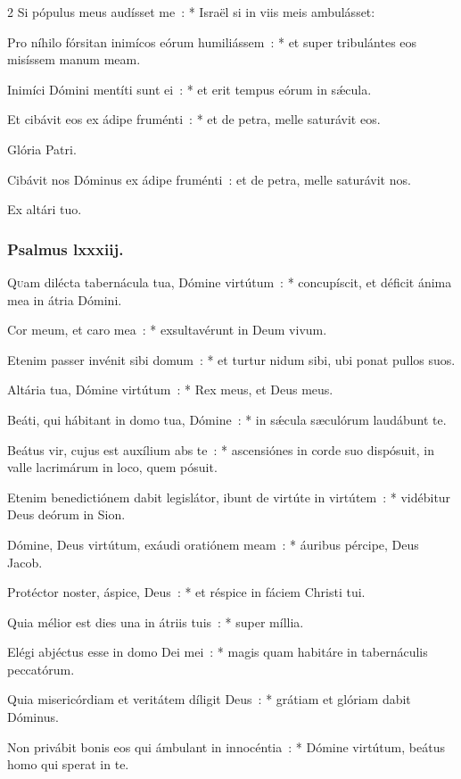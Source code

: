 \documentclass[9pt,twoside]{extarticle}
\begin{document}
\begin{multicols}{2}
Si pópulus meus audísset me~: * Israël si in viis meis ambulásset:

Pro níhilo fórsitan inimícos eórum humiliássem~: * et super tribulántes eos misíssem manum meam.

Inimíci Dómini mentíti sunt ei~: * et erit tempus eórum in sǽcula.

Et cibávit eos ex ádipe fruménti~: * et de petra, melle saturávit eos.

Glória Patri.

\begin{tightlist}{}
\item {} Cibávit nos Dóminus ex ádipe fruménti~: et de petra, melle saturávit nos.
\item {} Ex altári tuo.
\end{tightlist}

\subsubsection*{\center Psalmus lxxxiij.}
\lettrine{Q}uam dilécta tabernácula tua, Dómine virtútum~: * concupíscit, et déficit ánima mea in átria Dómini.

Cor meum, et caro mea~: * exsultavérunt in Deum vivum.

Etenim passer invénit sibi domum~: * et turtur nidum sibi, ubi ponat pullos suos.

Altária tua, Dómine virtútum~: * Rex meus, et Deus meus.

Beáti, qui hábitant in domo tua, Dómine~: * in sǽcula sæculórum laudábunt te.

Beátus vir, cujus est auxílium abs te~: * ascensiónes in corde suo dispósuit, in valle lacrimárum in loco, quem pósuit.

Etenim benedictiónem dabit legislátor, ibunt de virtúte in virtútem~: * vidébitur Deus deórum in Sion.

Dómine, Deus virtútum, exáudi oratiónem meam~: * áuribus pércipe, Deus Jacob.

Protéctor noster, áspice, Deus~: * et réspice in fáciem Christi tui.

Quia mélior est dies una in átriis tuis~: * super míllia.

Elégi abjéctus esse in domo Dei mei~: * magis quam habitáre in tabernáculis peccatórum.

Quia misericórdiam et veritátem díligit Deus~: * grátiam et glóriam dabit Dóminus.

Non privábit bonis eos qui ámbulant in innocéntia~: * Dómine virtútum, beátus homo qui sperat in te.


\end{multicols}
\end{document}
